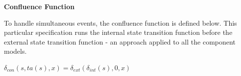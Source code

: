 \documentclass[10pt]{article}
\begin{document}
\textbf{Confluence Function}

To handle simultaneous events, the confluence function is defined below.  This particular specification runs the internal state transition function before the external state transition function - an approach applied to all the component models.

\begin{center}
  $\delta_{con}(s,ta(s),x)=\delta_{ext}(\delta_{int}(s),0,x)$ \\
\end{center}








\end{document}
